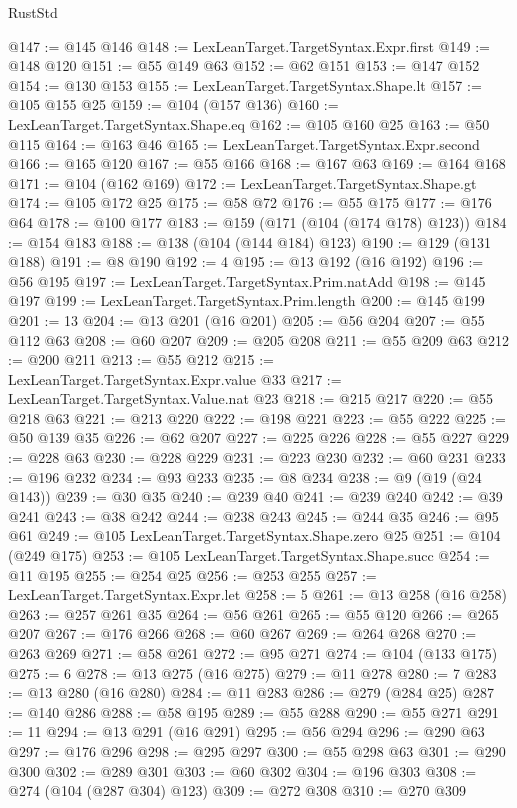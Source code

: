 \begin{lexlean}{RustStd}
\begin{coremodule}
@147 := @145 @146
@148 := LexLeanTarget.TargetSyntax.Expr.first
@149 := @148 @120
@151 := @55 @149 @63
@152 := @62 @151
@153 := @147 @152
@154 := @130 @153
@155 := LexLeanTarget.TargetSyntax.Shape.lt
@157 := @105 @155 @25
@159 := @104 (@157 @136)
@160 := LexLeanTarget.TargetSyntax.Shape.eq
@162 := @105 @160 @25
@163 := @50 @115
@164 := @163 @46
@165 := LexLeanTarget.TargetSyntax.Expr.second
@166 := @165 @120
@167 := @55 @166
@168 := @167 @63
@169 := @164 @168
@171 := @104 (@162 @169)
@172 := LexLeanTarget.TargetSyntax.Shape.gt
@174 := @105 @172 @25
@175 := @58 @72
@176 := @55 @175
@177 := @176 @64
@178 := @100 @177
@183 := @159 (@171 (@104 (@174 @178) @123))
@184 := @154 @183
@188 := @138 (@104 (@144 @184) @123)
@190 := @129 (@131 @188)
@191 := @8 @190
@192 := 4
@195 := @13 @192 (@16 @192)
@196 := @56 @195
@197 := LexLeanTarget.TargetSyntax.Prim.natAdd
@198 := @145 @197
@199 := LexLeanTarget.TargetSyntax.Prim.length
@200 := @145 @199
@201 := 13
@204 := @13 @201 (@16 @201)
@205 := @56 @204
@207 := @55 @112 @63
@208 := @60 @207
@209 := @205 @208
@211 := @55 @209 @63
@212 := @200 @211
@213 := @55 @212
@215 := LexLeanTarget.TargetSyntax.Expr.value @33
@217 := LexLeanTarget.TargetSyntax.Value.nat @23
@218 := @215 @217
@220 := @55 @218 @63
@221 := @213 @220
@222 := @198 @221
@223 := @55 @222
@225 := @50 @139 @35
@226 := @62 @207
@227 := @225 @226
@228 := @55 @227
@229 := @228 @63
@230 := @228 @229
@231 := @223 @230
@232 := @60 @231
@233 := @196 @232
@234 := @93 @233
@235 := @8 @234
@238 := @9 (@19 (@24 @143))
@239 := @30 @35
@240 := @239 @40
@241 := @239 @240
@242 := @39 @241
@243 := @38 @242
@244 := @238 @243
@245 := @244 @35
@246 := @95 @61
@249 := @105 LexLeanTarget.TargetSyntax.Shape.zero @25
@251 := @104 (@249 @175)
@253 := @105 LexLeanTarget.TargetSyntax.Shape.succ
@254 := @11 @195
@255 := @254 @25
@256 := @253 @255
@257 := LexLeanTarget.TargetSyntax.Expr.let
@258 := 5
@261 := @13 @258 (@16 @258)
@263 := @257 @261 @35
@264 := @56 @261
@265 := @55 @120
@266 := @265 @207
@267 := @176 @266
@268 := @60 @267
@269 := @264 @268
@270 := @263 @269
@271 := @58 @261
@272 := @95 @271
@274 := @104 (@133 @175)
@275 := 6
@278 := @13 @275 (@16 @275)
@279 := @11 @278
@280 := 7
@283 := @13 @280 (@16 @280)
@284 := @11 @283
@286 := @279 (@284 @25)
@287 := @140 @286
@288 := @58 @195
@289 := @55 @288
@290 := @55 @271
@291 := 11
@294 := @13 @291 (@16 @291)
@295 := @56 @294
@296 := @290 @63
@297 := @176 @296
@298 := @295 @297
@300 := @55 @298 @63
@301 := @290 @300
@302 := @289 @301
@303 := @60 @302
@304 := @196 @303
@308 := @274 (@104 (@287 @304) @123)
@309 := @272 @308
@310 := @270 @309

\end{coremodule}
\end{lexlean}
